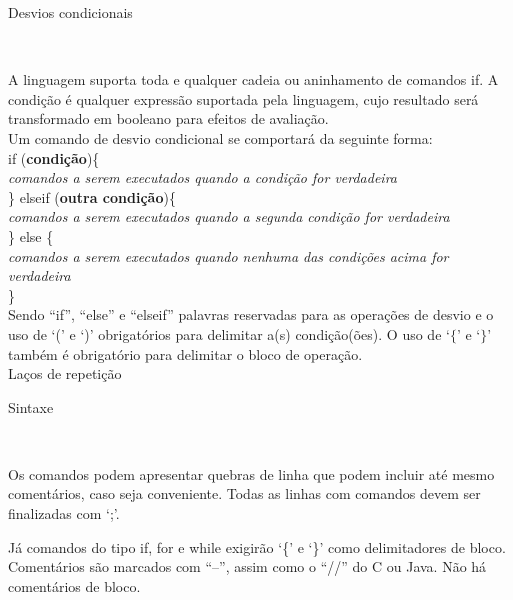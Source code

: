 \documentclass[12pt,a4paper]{article}
\def\emph#1{\textbf{#1}} %
\begin{document}
\hypertarget{label4}{\Large{Desvios condicionais}}\\[0.3cm]
\normalsize

A linguagem suporta toda e qualquer cadeia ou aninhamento de comandos if. A condição é qualquer expressão suportada pela linguagem, cujo resultado será transformado em booleano para efeitos de avaliação.\\

Um comando de desvio condicional se comportará da seguinte forma: \\

if (\emph{condição})\{ \\

\textit{comandos a serem executados quando a condição for verdadeira} \\

\} elseif (\emph{outra condição})\{\\

\textit{comandos a serem executados quando a segunda condição for verdadeira} \\

\} else \{\\


\textit{comandos a serem executados quando nenhuma das condições acima for verdadeira} \\

\}\\


Sendo ``if'', ``else'' e ``elseif'' palavras reservadas para as operações de desvio e o uso de `(' e `)' obrigatórios para delimitar a(s) condição(ões). O uso de `$\{$' e `$\}$' também é obrigatório para delimitar o bloco de operação.\\


\hypertarget{label5}{\Large{Laços de repetição}}\\[0.3cm]
\normalsize


\hypertarget{label6}{\Large{Sintaxe}}\\[0.3cm]
\normalsize

Os comandos podem apresentar quebras de linha que podem incluir até mesmo comentários, caso seja conveniente. Todas as linhas com comandos devem ser finalizadas com `;'.

Já comandos do tipo if, for e while exigirão `\{' e `\}' como delimitadores de bloco.
Comentários são marcados com ``--'', assim como o ``//'' do C ou Java. Não há comentários de bloco.\\
\end{document}
